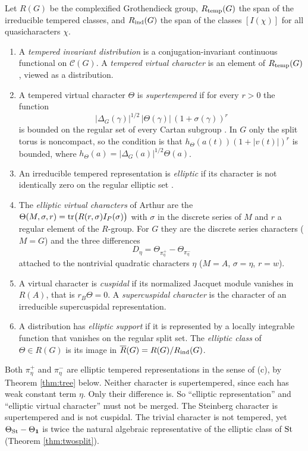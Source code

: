 \begin{definition}\label{def:six}
Let $R(G)$ be the complexified Grothendieck group, $R_{\rm temp}(G)$ the span of the irreducible tempered classes, and $R_{\rm ind}(G)$ the span of the classes $[I(\chi)]$ for all quasicharacters $\chi$.
\begin{enumerate}[label=(\alph*),leftmargin=*]
\item A \emph{tempered invariant distribution} is a conjugation-invariant continuous functional on $\mathcal C(G)$. A \emph{tempered virtual character} is an element of $R_{\rm temp}(G)$, viewed as a distribution.
\item A tempered virtual character $\Theta$ is \emph{supertempered} if for every $r>0$ the function\[|\Delta_G(\gamma)|^{1/2}\,|\Theta(\gamma)|\,(1+\sigma(\gamma))^r\]is bounded on the regular set of every Cartan subgroup \cite{He94}. In $G$ only the split torus is noncompact, so the condition is that $h_\Theta(a(t))(1+|v(t)|)^r$ is bounded, where $h_\Theta(a)=|\Delta_G(a)|^{1/2}\Theta(a)$.
\item An irreducible tempered representation is \emph{elliptic} if its character is not identically zero on the regular elliptic set \cite{Ar93}.
\item The \emph{elliptic virtual characters} of Arthur are the $\Theta(M,\sigma,r)=\operatorname{tr}\bigl(R(r,\sigma)I_P(\sigma)\bigr)$ with $\sigma$ in the discrete series of $M$ and $r$ a regular element of the $R$-group. For $G$ they are the discrete series characters ($M=G$) and the three differences
\begin{equation}\label{eq:alt}
D_\eta=\Theta_{\pi_\eta^+}-\Theta_{\pi_\eta^-}
\end{equation}
attached to the nontrivial quadratic characters $\eta$ ($M=A$, $\sigma=\eta$, $r=w$).
\item A virtual character is \emph{cuspidal} if its normalized Jacquet module vanishes in $R(A)$, that is $r_B\Theta=0$. A \emph{supercuspidal character} is the character of an irreducible supercuspidal representation.
\item A distribution has \emph{elliptic support} if it is represented by a locally integrable function that vanishes on the regular split set. The \emph{elliptic class} of $\Theta\in R(G)$ is its image in $\overline R(G)=R(G)/R_{\rm ind}(G)$.
\end{enumerate}
\end{definition}
\begin{example}\label{ex:supertemp}
Both $\pi_\eta^+$ and $\pi_\eta^-$ are elliptic tempered representations in the sense of (c), by Theorem \ref{thm:tree} below. Neither character is supertempered, since each has weak constant term $\eta$. Only their difference is. So ``elliptic representation'' and ``elliptic virtual character'' must not be merged. The Steinberg character is supertempered and is not cuspidal. The trivial character is not tempered, yet $\Theta_{\operatorname{St}}-\Theta_{\mathbf 1}$ is twice the natural algebraic representative of the elliptic class of $\operatorname{St}$ (Theorem \ref{thm:twosplit}).
\end{example}

